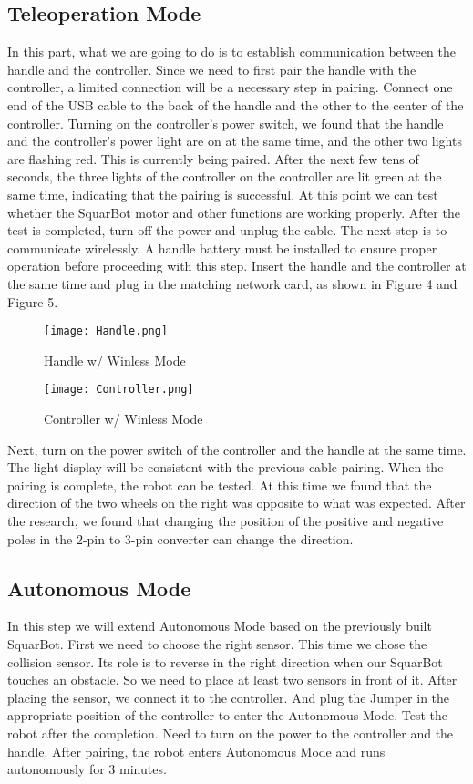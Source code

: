 \documentclass[12pt]{report}
\begin{document}
\subsection{Teleoperation Mode}
In this part, what we are going to do is to establish communication between the handle and the controller. Since we need to first pair the handle with the controller, a limited connection will be a necessary step in pairing. Connect one end of the USB cable to the back of the handle and the other to the center of the controller. Turning on the controller's power switch, we found that the handle and the controller's power light are on at the same time, and the other two lights are flashing red. This is currently being paired. After the next few tens of seconds, the three lights of the controller on the controller are lit green at the same time, indicating that the pairing is successful. At this point we can test whether the SquarBot motor and other functions are working properly. After the test is completed, turn off the power and unplug the cable. The next step is to communicate wirelessly. A handle battery must be installed to ensure proper operation before proceeding with this step. Insert the handle and the controller at the same time and plug in the matching network card, as shown in Figure 4 and Figure 5. 
\begin{figure}[htbp]
	\centering
	\begin{minipage}[t]{0.48\textwidth}
		\centering
		\texttt{[image: Handle.png]}
		\caption{Handle w/ Winless Mode}
	\end{minipage}
	\begin{minipage}[t]{0.48\textwidth}
		\centering
		\texttt{[image: Controller.png]}
		\caption{Controller w/ Winless Mode}
	\end{minipage}
\end{figure}
Next, turn on the power switch of the controller and the handle at the same time. The light display will be consistent with the previous cable pairing. When the pairing is complete, the robot can be tested. At this time we found that the direction of the two wheels on the right was opposite to what was expected. After the research, we found that changing the position of the positive and negative poles in the 2-pin to 3-pin converter can change the direction.

\subsection{Autonomous Mode}
In this step we will extend Autonomous Mode based on the previously built SquarBot. First we need to choose the right sensor. This time we chose the collision sensor. Its role is to reverse in the right direction when our SquarBot touches an obstacle. So we need to place at least two sensors in front of it. After placing the sensor, we connect it to the controller. And plug the Jumper in the appropriate position of the controller to enter the Autonomous Mode. Test the robot after the completion. Need to turn on the power to the controller and the handle. After pairing, the robot enters Autonomous Mode and runs autonomously for 3 minutes.
\end{document}
